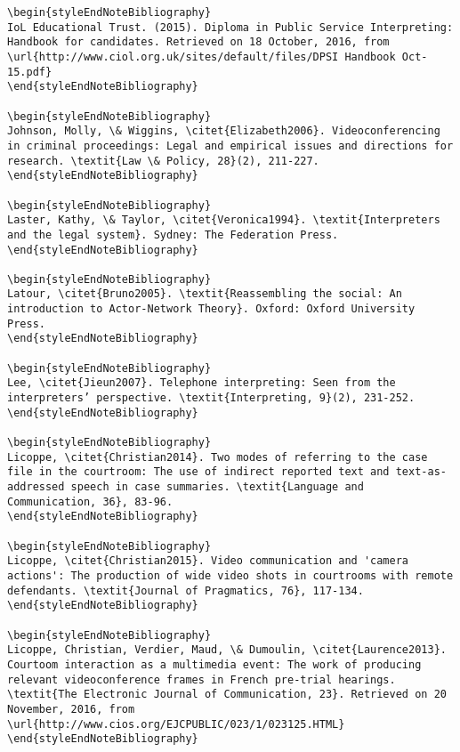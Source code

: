 \documentclass[output=paper]{langsci/langscibook}
\begin{document}
\begin{verbatim}
\begin{styleEndNoteBibliography}
IoL Educational Trust. (2015). Diploma in Public Service Interpreting: Handbook for candidates. Retrieved on 18 October, 2016, from \url{http://www.ciol.org.uk/sites/default/files/DPSI Handbook Oct-15.pdf}
\end{styleEndNoteBibliography}

\begin{styleEndNoteBibliography}
Johnson, Molly, \& Wiggins, \citet{Elizabeth2006}. Videoconferencing in criminal proceedings: Legal and empirical issues and directions for research. \textit{Law \& Policy, 28}(2), 211-227. 
\end{styleEndNoteBibliography}

\begin{styleEndNoteBibliography}
Laster, Kathy, \& Taylor, \citet{Veronica1994}. \textit{Interpreters and the legal system}. Sydney: The Federation Press.
\end{styleEndNoteBibliography}

\begin{styleEndNoteBibliography}
Latour, \citet{Bruno2005}. \textit{Reassembling the social: An introduction to Actor-Network Theory}. Oxford: Oxford University Press.
\end{styleEndNoteBibliography}

\begin{styleEndNoteBibliography}
Lee, \citet{Jieun2007}. Telephone interpreting: Seen from the interpreters’ perspective. \textit{Interpreting, 9}(2), 231-252. 
\end{styleEndNoteBibliography}

\begin{styleEndNoteBibliography}
Licoppe, \citet{Christian2014}. Two modes of referring to the case file in the courtroom: The use of indirect reported text and text-as-addressed speech in case summaries. \textit{Language and Communication, 36}, 83-96. 
\end{styleEndNoteBibliography}

\begin{styleEndNoteBibliography}
Licoppe, \citet{Christian2015}. Video communication and 'camera actions': The production of wide video shots in courtrooms with remote defendants. \textit{Journal of Pragmatics, 76}, 117-134. 
\end{styleEndNoteBibliography}

\begin{styleEndNoteBibliography}
Licoppe, Christian, Verdier, Maud, \& Dumoulin, \citet{Laurence2013}. Courtoom interaction as a multimedia event: The work of producing relevant videoconference frames in French pre-trial hearings. \textit{The Electronic Journal of Communication, 23}. Retrieved on 20 November, 2016, from \url{http://www.cios.org/EJCPUBLIC/023/1/023125.HTML}
\end{styleEndNoteBibliography}


\end{verbatim}
\end{document}
